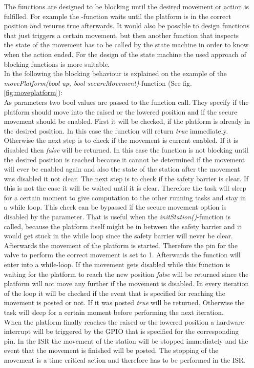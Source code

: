 The functions are designed to be blocking until the desired movement or action is fulfilled. For example the -function waits until the platform is in the correct position and returns true afterwards. It would also be possible to design functions that just triggers a certain movement, but then another function that inspects the state of the movement has to be called by the state machine in order to know when the action ended. For the design of the state machine the used approach of blocking functions is more suitable. \\

In the following the blocking behaviour is explained on the example of the \textit{movePlatform(bool up, bool secureMovement)}-function (See fig. \ref{fig:moveplatform}): \\
As parameters two bool values are passed to the function call. They specify if the platform should move into the raised or the lowered position and if the secure movement should be enabled. 
First it will be checked, if the platform is already in the desired position. In this case the function will return \textit{true} immediately. Otherwise the next step is to check if the movement is current enabled. If it is disabled then \textit{false} will be returned. In this case the function is not blocking until the desired position is reached because it cannot be determined if the movement will ever be enabled again and also the state of the station after the movement was disabled it not clear.
The next step is to check if the safety barrier is clear. If this is not the case it will be waited until it is clear. Therefore the task will sleep for a certain moment to give computation to the other running tasks and stay in a while loop. This check can be bypassed if the secure movement option is disabled by the parameter. That is useful when the \textit{initStation()}-function is called, because the platform itself might be in between the safety barrier and it would get stuck in the while loop since the safety barrier will never be clear.
Afterwards the movement of the platform is started. Therefore the pin for the valve to perform the correct movement is set to 1. 
Afterwards the function will enter into a while-loop. If the movement gets disabled while this function is waiting for the platform to reach the new position \textit{false} will be returned since the platform will not move any further if the movement is disabled. In every iteration of the loop it will be checked if the event that is specified for reaching the movement is posted or not. If it was posted \textit{true} will be returned. Otherwise the task will sleep for a certain moment before performing the next iteration.\\
When the platform finally reaches the raised or the lowered position a hardware interrupt will be triggered by the GPIO that is specified for the corresponding pin. In the ISR the movement of the station will be stopped immediately and the event that the movement is finished will be posted. The stopping of the movement is a time critical action and therefore has to be performed in the ISR. 


